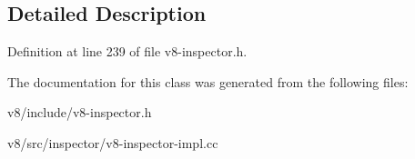 \subsection{Detailed Description}


Definition at line 239 of file v8-\/inspector.\+h.



The documentation for this class was generated from the following files\+:\begin{DoxyCompactItemize}
\item 
v8/include/v8-\/inspector.\+h\item 
v8/src/inspector/v8-\/inspector-\/impl.\+cc\end{DoxyCompactItemize}
